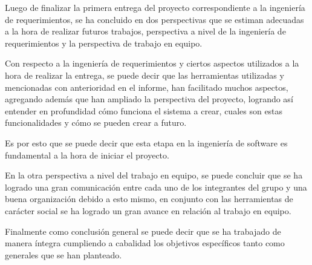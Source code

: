 \documentclass{memoria}
\begin{document}
\newpage



Luego de finalizar la primera entrega del proyecto correspondiente a la ingeniería de requerimientos, se ha concluido en dos perspectivas que se estiman adecuadas a la hora de realizar futuros trabajos, perspectiva a nivel de la ingeniería de requerimientos y la perspectiva de trabajo en equipo.

Con respecto a la ingeniería de requerimientos y ciertos aspectos utilizados a la hora de realizar la entrega, se puede decir que las herramientas utilizadas y mencionadas con anterioridad en el informe, han facilitado muchos aspectos, agregando además que han ampliado la perspectiva del proyecto, logrando así entender en profundidad cómo funciona el sistema a crear, cuales son estas funcionalidades y cómo se pueden crear a futuro.

Es por esto que se puede decir que esta etapa en la ingeniería de software es fundamental a la hora de iniciar el proyecto.

En la otra perspectiva a nivel del trabajo en equipo, se puede concluir que se ha logrado una gran comunicación entre cada uno de los integrantes del grupo y una buena organización debido a esto mismo, en conjunto con las herramientas de carácter social se ha logrado un gran avance en relación al trabajo en equipo.

Finalmente como conclusión general se puede decir que se ha trabajado de manera íntegra cumpliendo a cabalidad los objetivos específicos tanto como generales que se han planteado.


\end{document}
